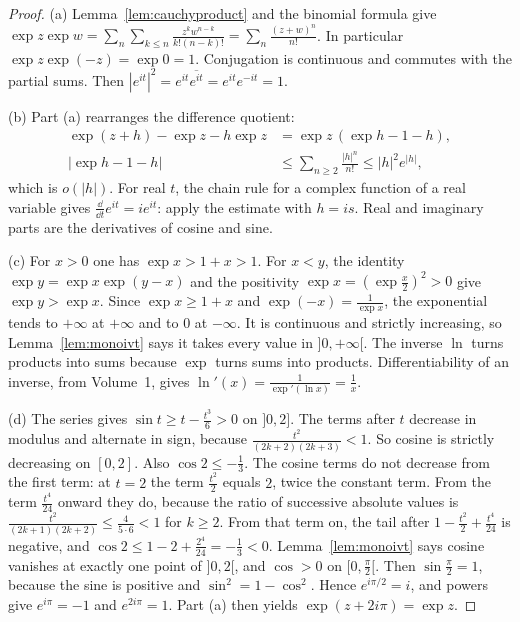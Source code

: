 \begin{proof}
(a) Lemma~\ref{lem:cauchyproduct} and the binomial formula give $\exp z\exp w=\sum_n\sum_{k\le n}\frac{z^kw^{n-k}}{k!(n-k)!}=\sum_n\frac{(z+w)^n}{n!}$. In particular $\exp z\exp(-z)=\exp0=1$. Conjugation is continuous and commutes with the partial sums. Then $|e^{it}|^2=e^{it}\overline{e^{it}}=e^{it}e^{-it}=1$.

(b) Part (a) rearranges the difference quotient:
\[
\begin{aligned}\exp(z+h)-\exp z-h\exp z&=\exp z\,(\exp h-1-h),\\|\exp h-1-h|&\le\sum_{n\ge2}\frac{|h|^n}{n!}\le|h|^2e^{|h|},\end{aligned}
\]
which is $o(|h|)$. For real $t$, the chain rule for a complex function of a real variable gives $\frac{\dd}{\dd t}e^{it}=ie^{it}$: apply the estimate with $h=is$. Real and imaginary parts are the derivatives of cosine and sine.

(c) For $x>0$ one has $\exp x>1+x>1$. For $x<y$, the identity $\exp y=\exp x\exp(y-x)$ and the positivity $\exp x=(\exp\frac x2)^2>0$ give $\exp y>\exp x$. Since $\exp x\ge1+x$ and $\exp(-x)=\frac1{\exp x}$, the exponential tends to $+\infty$ at $+\infty$ and to $0$ at $-\infty$. It is continuous and strictly increasing, so Lemma~\ref{lem:monoivt} says it takes every value in $]0,+\infty[$. The inverse $\ln$ turns products into sums because $\exp$ turns sums into products. Differentiability of an inverse, from Volume~1, gives $\ln'(x)=\frac1{\exp'(\ln x)}=\frac1x$.

(d) The series gives $\sin t\ge t-\frac{t^3}6>0$ on $]0,2]$. The terms after $t$ decrease in modulus and alternate in sign, because $\frac{t^2}{(2k+2)(2k+3)}<1$. So cosine is strictly decreasing on $[0,2]$. Also $\cos2\le-\frac13$. The cosine terms do not decrease from the first term: at $t=2$ the term $\frac{t^2}2$ equals $2$, twice the constant term. From the term $\frac{t^4}{24}$ onward they do, because the ratio of successive absolute values is $\frac{t^2}{(2k+1)(2k+2)}\le\frac4{5\cdot6}<1$ for $k\ge2$. From that term on, the tail after $1-\frac{t^2}2+\frac{t^4}{24}$ is negative, and $\cos2\le1-2+\frac{2^4}{24}=-\frac13<0$. Lemma~\ref{lem:monoivt} says cosine vanishes at exactly one point of $]0,2[$, and $\cos>0$ on $[0,\frac\pi2[$. Then $\sin\frac\pi2=1$, because the sine is positive and $\sin^2=1-\cos^2$. Hence $e^{i\pi/2}=i$, and powers give $e^{i\pi}=-1$ and $e^{2i\pi}=1$. Part (a) then yields $\exp(z+2i\pi)=\exp z$.


\end{proof}
